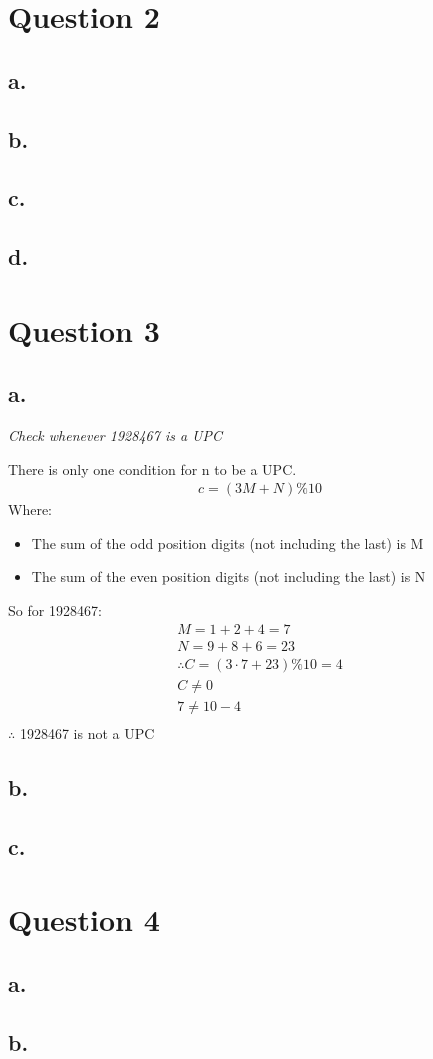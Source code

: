 \documentclass[a4paper, 12pt]{article}
\begin{document}
\section*{Question 2}
\subsection*{a.}
\subsection*{b.}
\subsection*{c.}
\subsection*{d.}
\section*{Question 3}
\subsection*{a.}
\begin{center}
    \textit{Check whenever 1928467 is a UPC} \\
\end{center}

There is only one condition for n to be a UPC.
\begin{align*}
    c = (3M + N)\%10
\end{align*}
Where:
\begin{itemize}
    \item The sum of the odd position digits (not including the last) is M 
    \item The sum of the even position digits (not including the last) is N 
\end{itemize}
So for 1928467:
\begin{align*}
    M = 1 + 2 + 4 = 7 \\
    N = 9 + 8 + 6 = 23  \\
    \therefore C = (3\cdot7 + 23)\%10 = 4 \\
    C \neq 0 \\
    7 \neq 10 - 4 \\
\end{align*}
$\therefore$ 1928467 is not a UPC 

\subsection*{b.}
\subsection*{c.}
\section*{Question 4}
\subsection*{a.}
\subsection*{b.}
\end{document}
